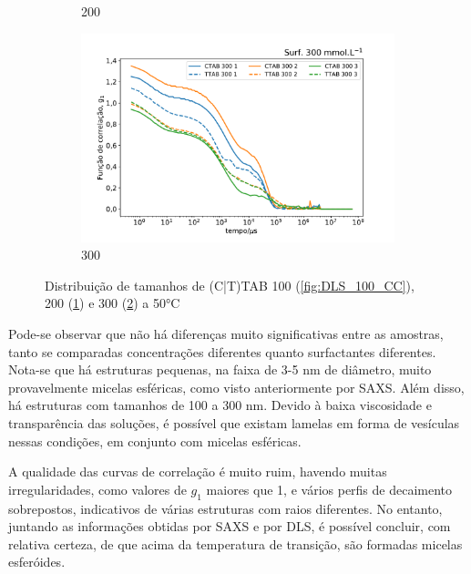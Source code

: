 \begin{figure}[H]
\begin{subfigure}{0.3\textwidth}
		\caption{200\mM}
		\label{fig:DLS_200_CC}
	\end{subfigure} %
	\begin{subfigure}{0.3\textwidth}
		\centering
		\includegraphics[width=\textwidth]{imagens/dls/300_CC}
		\caption{300\mM}
		\label{fig:DLS_300_CC}
	\end{subfigure}
	\caption{Distribuição de tamanhos de (C|T)TAB 100 (\ref{fig:DLS_100_CC}), 200 (\ref{fig:DLS_200_CC}) e 300 (\ref{fig:DLS_300_CC}) \mM{} a 50°C}
	\label{fig:DLS_CC_conc}
\end{figure}

	Pode-se observar que não há diferenças muito significativas entre as amostras, tanto se comparadas concentrações diferentes quanto surfactantes diferentes. Nota-se que há estruturas pequenas, na faixa de 3-5 nm de diâmetro, muito provavelmente micelas esféricas, como visto anteriormente por SAXS. Além disso, há estruturas com tamanhos de 100 a 300 nm. Devido à baixa viscosidade e transparência das soluções, é possível que existam lamelas em forma de vesículas nessas condições, em conjunto com micelas esféricas.
	
	A qualidade das curvas de correlação é muito ruim, havendo muitas irregularidades, como valores de $g_1$ maiores que 1, e vários perfis de decaimento sobrepostos, indicativos de várias estruturas com raios diferentes. No entanto, juntando as informações obtidas por SAXS e por DLS, é possível concluir, com relativa certeza, de que acima da temperatura de transição, são formadas micelas esferóides. 
	
